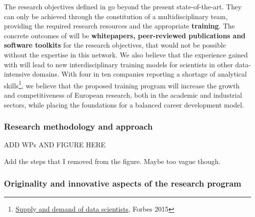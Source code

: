 
The research objectives defined in \acronym go beyond the present state-of-the-art. 
They can only be achieved through the constitution of a multidisciplinary team, providing the required research resources and the appropriate \textbf{training}. 
The concrete outcomes of \acronym will be \textbf{whitepapers, peer-reviewed publications and software toolkits} for the research objectives, that would not be possible without the expertise in this network. 
We also believe that the experience gained with \acronym will lead to new interdisciplinary training models for scientists in other data-intensive domains.
With four in ten companies reporting a shortage of analytical skills\footnote{\href{http://www.forbes.com/sites/gilpress/2015/04/30/the-supply-and-demand-of-data-scientists-what-the-surveys-say/}{Supply and demand of data scientists}, Forbes 2015}, we believe that the proposed training program will increase the growth and competitiveness of European research, both in the academic and industrial sectors, while placing the foundations for a balanced career development model.

\subsubsection{Research methodology and approach}

ADD WPs AND FIGURE HERE 

Add the steps that I removed from the figure. Maybe too vague though.  


\subsubsection{Originality and innovative aspects of the research program} 
\label{sub:Originality}

